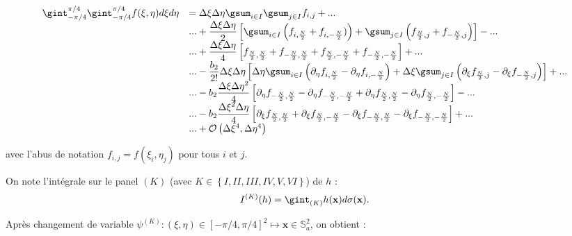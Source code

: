 \begin{equation}
\begin{array}{rl}
\gint_{-\pi/4}^{\pi/4} \gint_{-\pi/4}^{\pi/4} f(\xi,\eta)d\xi d\eta &  = \Delta \xi \Delta \eta \gsum_{i \in I} \gsum_{j \in I} f_{i,j} + ... \\

 & ... + \dfrac{\Delta \xi \Delta \eta}{2} \left[ \gsum_{i \in I} \left(  f_{i,\frac{N}{2}} + f_{i,-\frac{N}{2}})  \right) + \gsum_{j \in I} \left(  f_{\frac{N}{2},j} + f_{-\frac{N}{2},j}  \right) \right] - ... \\
 
 & ... + \dfrac{\Delta \xi \Delta \eta}{4} \left[ f_{\frac{N}{2},\frac{N}{2}}+f_{-\frac{N}{2},\frac{N}{2}}+f_{\frac{N}{2},-\frac{N}{2}}+f_{-\frac{N}{2},-\frac{N}{2}} \right] + ... \\
 
 &  ... - \dfrac{b_2}{2!} \Delta \xi \Delta \eta \left[ \Delta \eta \gsum_{i \in I} \left(  \partial_{\eta }f_{i,\frac{N}{2}} -  \partial_{\eta }f_{i,-\frac{N}{2}}  \right) + \Delta \xi \gsum_{j \in I} \left(   \partial_{\xi }f_{\frac{N}{2},j} - \partial_{\xi }f_{-\frac{N}{2},j}  \right) \right] + ... \\

  & ... - b_2 \dfrac{\Delta \xi \Delta \eta^2}{4} \left[ \partial_{\eta} f_{-\frac{N}{2},\frac{N}{2}} - \partial_{\eta} f_{-\frac{N}{2},-\frac{N}{2}} + \partial_{\eta} f_{\frac{N}{2},\frac{N}{2}} -\partial_{\eta} f_{\frac{N}{2},-\frac{N}{2}}  \right] - ... \\
 
  & ... - b_2 \dfrac{\Delta \xi^2 \Delta \eta}{4} \left[ \partial_{\xi} f_{\frac{N}{2},\frac{N}{2}} + \partial_{\xi} f_{\frac{N}{2},-\frac{N}{2}} - \partial_{\xi} f_{-\frac{N}{2},\frac{N}{2}} -\partial_{\xi} f_{-\frac{N}{2},-\frac{N}{2}}  \right] + ... \\
  
  & ... + \mathcal{O} \left( \Delta \xi^4, \Delta \eta^4 \right)
  \end{array}
\label{eq:euler maclaurin 2d composite}
\end{equation}

avec l'abus de notation $f_{i,j} = f(\xi_i, \eta_j)$ pour tous $i$ et $j$.

On note l'intégrale sur le panel $(K)$ (avec $K \in \left\lbrace I, II, III, IV, V, VI \right\rbrace$) de $h$ :
$$I^{(K)}(h) = \gint_{(K)} h(\mathbf{x}) d \sigma (\mathbf{x}).$$

Après changement de variable $\psi^{(K)} : (\xi, \eta) \in [-\pi/4, \pi/4]^2 \mapsto \mathbf{x} \in \mathbb{S}_a^2$, on obtient :

